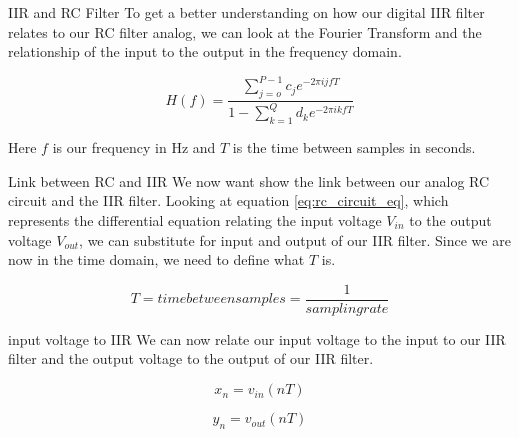 \documentclass[notes]{beamer}
\begin{document}
\begin{frame}
\begin{block}{IIR and RC Filter}
To get a better understanding on how our digital IIR filter relates to our RC filter analog, we can look at the Fourier Transform and the relationship of the input to the output in the frequency domain.

\begin{equation}\label{Fourier}
H(f)=\frac{\displaystyle\sum\limits_{j=o}^{P-1} c_je^{-2\pi ijfT}}{1-\displaystyle\sum\limits_{k=1}^{Q} d_ke^{-2\pi ikfT}}
\end{equation}

Here $f$ is our frequency in Hz and $T$ is the time between samples in seconds.
\end{block}
\end{frame}

\begin{frame}
\begin{block}{Link between RC and IIR}
We now want show the link between our analog RC circuit and the IIR filter.  Looking at equation \ref{eq:rc_circuit_eq}, which represents the differential equation relating the input voltage $V_{in}$ to the output voltage $V_{out}$, we can substitute for input and output of our IIR filter.  Since we are now in the time domain, we need to define what $T$ is.

\begin{equation}\label{Sample}
T=time between samples=\frac{1}{sampling rate}
\end{equation}
\end{block}
\end{frame}

\begin{frame}
\begin{block}{input voltage to IIR}
We can now relate our input voltage to the input to our IIR filter and the output voltage to the output of our IIR filter.

\begin{equation}\label{IIRxn}
x_n=v_{in}(nT)
\end{equation}

\begin{equation}\label{yn_out}
y_n=v_{out}(nT)
\end{equation}
\end{block}
\end{frame}
\end{document}
